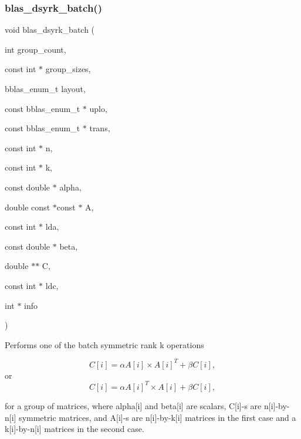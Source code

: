 \subsubsection{\texorpdfstring{blas\+\_\+dsyrk\+\_\+batch()}{blas\_dsyrk\_batch()}}
{\footnotesize\ttfamily void blas\+\_\+dsyrk\+\_\+batch (\begin{DoxyParamCaption}\item[{int}]{group\+\_\+count,  }\item[{const int $\ast$}]{group\+\_\+sizes,  }\item[{bblas\+\_\+enum\+\_\+t}]{layout,  }\item[{const bblas\+\_\+enum\+\_\+t $\ast$}]{uplo,  }\item[{const bblas\+\_\+enum\+\_\+t $\ast$}]{trans,  }\item[{const int $\ast$}]{n,  }\item[{const int $\ast$}]{k,  }\item[{const double $\ast$}]{alpha,  }\item[{double const $\ast$const $\ast$}]{A,  }\item[{const int $\ast$}]{lda,  }\item[{const double $\ast$}]{beta,  }\item[{double $\ast$$\ast$}]{C,  }\item[{const int $\ast$}]{ldc,  }\item[{int $\ast$}]{info }\end{DoxyParamCaption})}

Performs one of the batch symmetric rank k operations

\[ C[i] = \alpha A[i] \times A[i]^T + \beta C[i], \] or \[ C[i] = \alpha A[i]^T \times A[i] + \beta C[i], \]

for a group of matrices, where alpha\mbox{[}i\mbox{]} and beta\mbox{[}i\mbox{]} are scalars, C\mbox{[}i\mbox{]}-\/s are n\mbox{[}i\mbox{]}-\/by-\/n\mbox{[}i\mbox{]} symmetric matrices, and A\mbox{[}i\mbox{]}-\/s are n\mbox{[}i\mbox{]}-\/by-\/k\mbox{[}i\mbox{]} matrices in the first case and a k\mbox{[}i\mbox{]}-\/by-\/n\mbox{[}i\mbox{]} matrices in the second case.



